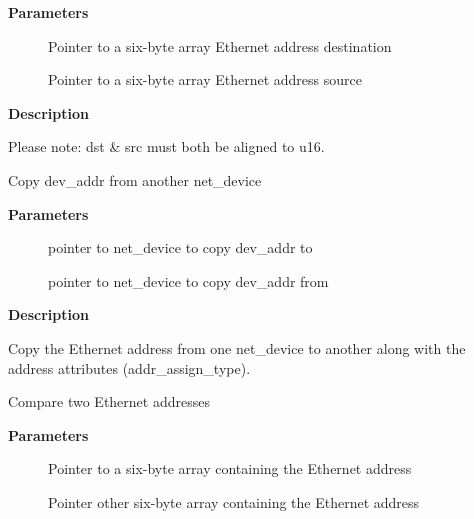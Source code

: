 \documentclass[a4paper,8pt,english]{sphinxmanual}
\begin{document}
\textbf{Parameters}
\begin{description}
\item[{}] \leavevmode
Pointer to a six-byte array Ethernet address destination

\item[{}] \leavevmode
Pointer to a six-byte array Ethernet address source

\end{description}

\textbf{Description}

Please note: dst \& src must both be aligned to u16.

\begin{fulllineitems}
\label{networking/kapi:c.eth_hw_addr_inherit}
Copy dev\_addr from another net\_device

\end{fulllineitems}


\textbf{Parameters}
\begin{description}
\item[{}] \leavevmode
pointer to net\_device to copy dev\_addr to

\item[{}] \leavevmode
pointer to net\_device to copy dev\_addr from

\end{description}

\textbf{Description}

Copy the Ethernet address from one net\_device to another along with
the address attributes (addr\_assign\_type).

\begin{fulllineitems}
\label{networking/kapi:c.ether_addr_equal}
Compare two Ethernet addresses

\end{fulllineitems}


\textbf{Parameters}
\begin{description}
\item[{}] \leavevmode
Pointer to a six-byte array containing the Ethernet address

\item[{}] \leavevmode
Pointer other six-byte array containing the Ethernet address

\end{description}
\end{document}
